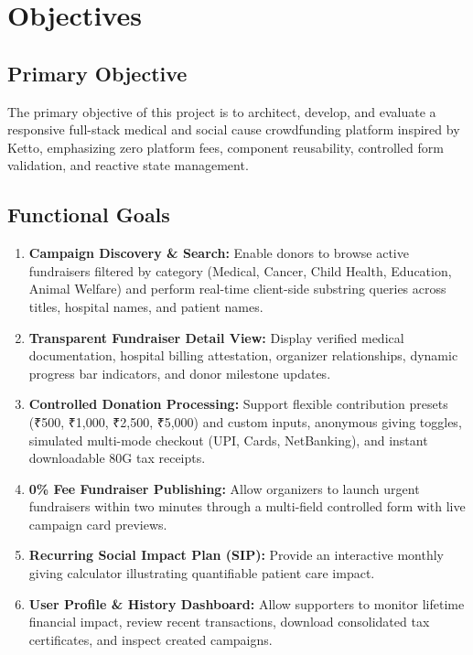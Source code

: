 \documentclass[12pt,a4paper,oneside]{report}
\begin{document}
\chapter{Objectives}

\section{Primary Objective}
The primary objective of this project is to architect, develop, and evaluate a responsive full-stack medical and social cause crowdfunding platform inspired by Ketto, emphasizing zero platform fees, component reusability, controlled form validation, and reactive state management.

\section{Functional Goals}
\begin{enumerate}
    \item \textbf{Campaign Discovery \& Search:} Enable donors to browse active fundraisers filtered by category (Medical, Cancer, Child Health, Education, Animal Welfare) and perform real-time client-side substring queries across titles, hospital names, and patient names.
    \item \textbf{Transparent Fundraiser Detail View:} Display verified medical documentation, hospital billing attestation, organizer relationships, dynamic progress bar indicators, and donor milestone updates.
    \item \textbf{Controlled Donation Processing:} Support flexible contribution presets (₹500, ₹1,000, ₹2,500, ₹5,000) and custom inputs, anonymous giving toggles, simulated multi-mode checkout (UPI, Cards, NetBanking), and instant downloadable 80G tax receipts.
    \item \textbf{0\% Fee Fundraiser Publishing:} Allow organizers to launch urgent fundraisers within two minutes through a multi-field controlled form with live campaign card previews.
    \item \textbf{Recurring Social Impact Plan (SIP):} Provide an interactive monthly giving calculator illustrating quantifiable patient care impact.
    \item \textbf{User Profile \& History Dashboard:} Allow supporters to monitor lifetime financial impact, review recent transactions, download consolidated tax certificates, and inspect created campaigns.
\end{enumerate}
\end{document}
